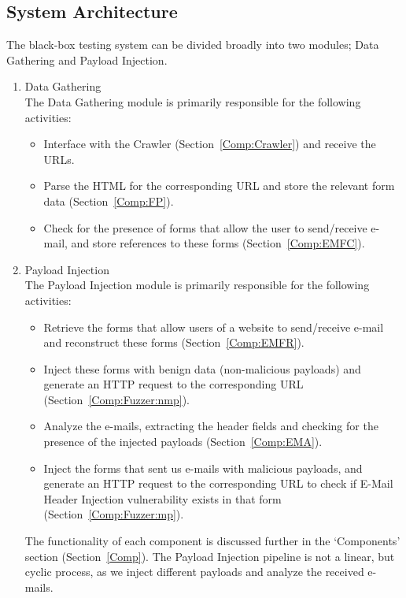 \subsection{System Architecture}
\label{sys:arch}
The black-box testing system can be divided broadly into two modules; Data Gathering and Payload Injection.
\begin{enumerate}
	\item Data Gathering\\
	The Data Gathering module is primarily responsible for the following activities:
	\begin{itemize}
		\item Interface with the Crawler (Section~\ref{Comp:Crawler}) and receive the URLs.
		\item Parse the HTML for the corresponding URL and store the relevant form data (Section~\ref{Comp:FP}).
		\item Check for the presence of forms that allow the user to send/receive e-mail, and store references to these forms (Section~\ref{Comp:EMFC}).
	\end{itemize} 
	\item Payload Injection\\
	The Payload Injection module is primarily responsible for the following activities:
	\begin{itemize}
		\item Retrieve the forms that allow users of a website to send/receive e-mail and reconstruct these forms (Section~\ref{Comp:EMFR}).
		\item Inject these forms with benign data (non-malicious payloads) and generate an HTTP request to the corresponding URL (Section~\ref{Comp:Fuzzer:nmp}).
		\item Analyze the e-mails, extracting the header fields and checking for the presence of the injected payloads (Section~\ref{Comp:EMA}).
		\item Inject the forms that sent us e-mails with malicious payloads, and generate an HTTP request to the corresponding URL to check if E-Mail Header Injection vulnerability exists in that form (Section~\ref{Comp:Fuzzer:mp}).
	\end{itemize} 
	The functionality of each component is discussed further in the `Components' section (Section~\ref{Comp}). The Payload Injection pipeline is not a linear, but cyclic process, as we inject different payloads and analyze the received e-mails.
\end{enumerate}
